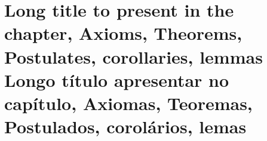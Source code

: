 
%


\chapter[\lang{Abbreviation for the Table of Contents}{Abreviação para o Sumário}]
{
    \lang
    {Long title to present in the chapter, Axioms, Theorems, Postulates, corollaries, lemmas}
    {Longo título apresentar no capítulo, Axiomas, Teoremas, Postulados, corolários, lemas}
}

\label{cap_exemplos}


\begin{flushright}
    \englishword{ }
\end{flushright}



